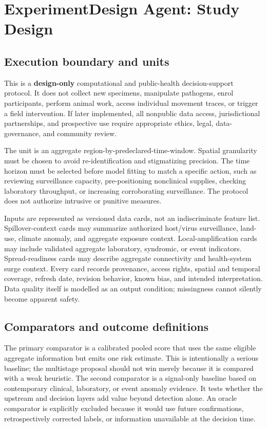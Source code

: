 \documentclass[conference]{IEEEtran}
\begin{document}
\section{ExperimentDesign Agent: Study Design}

\subsection{Execution boundary and units}

This is a \textbf{design-only} computational and public-health decision-support protocol. It does not collect new specimens, manipulate pathogens, enrol participants, perform animal work, access individual movement traces, or trigger a field intervention. If later implemented, all nonpublic data access, jurisdictional partnerships, and prospective use require appropriate ethics, legal, data-governance, and community review.

The unit is an aggregate region-by-predeclared-time-window. Spatial granularity must be chosen to avoid re-identification and stigmatizing precision. The time horizon must be selected before model fitting to match a specific action, such as reviewing surveillance capacity, pre-positioning nonclinical supplies, checking laboratory throughput, or increasing corroborating surveillance. The protocol does not authorize intrusive or punitive measures.

Inputs are represented as versioned data cards, not an indiscriminate feature list. Spillover-context cards may summarize authorized host/virus surveillance, land-use, climate anomaly, and aggregate exposure context. Local-amplification cards may include validated aggregate laboratory, syndromic, or event indicators. Spread-readiness cards may describe aggregate connectivity and health-system surge context. Every card records provenance, access rights, spatial and temporal coverage, refresh date, revision behavior, known bias, and intended interpretation. Data quality itself is modelled as an output condition; missingness cannot silently become apparent safety.

\subsection{Comparators and outcome definitions}

The primary comparator is a calibrated pooled score that uses the same eligible aggregate information but emits one risk estimate. This is intentionally a serious baseline; the multistage proposal should not win merely because it is compared with a weak heuristic. The second comparator is a signal-only baseline based on contemporary clinical, laboratory, or event anomaly evidence. It tests whether the upstream and decision layers add value beyond detection alone. An oracle comparator is explicitly excluded because it would use future confirmations, retrospectively corrected labels, or information unavailable at the decision time.
\end{document}
